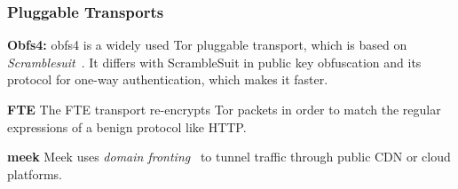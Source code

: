 \subsubsection{Pluggable Transports}
\begin{compactitem}
\item	\textbf{Obfs4:}
obfs4 is a widely used Tor pluggable transport, which is based on \textit{Scramblesuit}~\cite{scramblesuit}. It differs with ScrambleSuit in public key obfuscation and its protocol for one-way authentication, which makes it faster. 
\item \textbf{FTE} 
The FTE transport re-encrypts Tor packets in order to match the regular expressions of a benign protocol like HTTP. 
\item\textbf{meek}
Meek uses \textit{domain fronting}~\cite{meek-PETS} to tunnel traffic through public CDN or cloud platforms. 
\end{compactitem}
